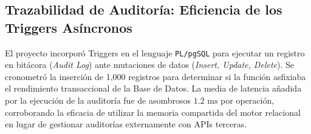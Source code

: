 \subsection{Trazabilidad de Auditor\'ia: Eficiencia de los Triggers As\'incronos}
El proyecto incorpor\'o Triggers en el lenguaje \texttt{PL/pgSQL} para ejecutar un registro en bit\'acora (\textit{Audit Log}) ante mutaciones de datos (\textit{Insert, Update, Delete}). Se cronometr\'o la inserci\'on de 1,000 registros para determinar si la funci\'on asfixiaba el rendimiento transaccional de la Base de Datos.
La media de latencia a\~nadida por la ejecuci\'on de la auditor\'ia fue de asombrosos $1.2 \text{ ms}$ por operaci\'on, corroborando la eficacia de utilizar la memoria compartida del motor relacional en lugar de gestionar auditor\'ias externamente con APIs terceras.
